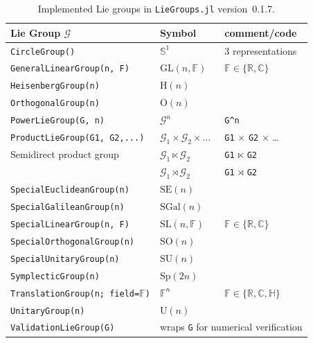 \documentclass{juliacon}
\newcommand{\LieGroupsVersion}{0.1.7}
\begin{document}
\begin{table}[tbp]
    \centering
    \caption{Implemented Lie groups in \texttt{LieGroups.jl} version~\LieGroupsVersion{}.}
    \begin{tabular}{@{}lll@{}}
        \toprule
        \textbf{Lie Group $\mathcal G$} & \textbf{Symbol} & comment/code\\
        \midrule
        \verb|CircleGroup()| & \(\mathbb{S}^1\) & 3 representations \\
        \verb|GeneralLinearGroup(n, F)| & \(\mathrm{GL}(n, \mathbb{F})\) & $\mathbb{F} \in \{\mathbb{R}, \mathbb{C}\}$\\
        \verb|HeisenbergGroup(n)| & \(\mathrm{H}(n)\)\\
        \verb|OrthogonalGroup(n)| & \(\mathrm{O}(n)\) &\\
        \midrule
        \verb|PowerLieGroup(G, n)| & \(\mathcal G^n\) & \verb|G^n|\\
        \verb|ProductLieGroup(G1, G2,...)| & \(\mathcal G_1 \times \mathcal G_2 \times \ldots\) & \verb|G1| $\times$ \verb|G2| $\times$ \ldots\\
        Semidirect product group & \(\mathcal G_1 \ltimes \mathcal G_2\) & \verb|G1| $\ltimes$ \verb|G2|\\
                                 & \(\mathcal G_1 \rtimes \mathcal G_2\) & \verb|G1| $\rtimes$ \verb|G2|\\
        \midrule
        \verb|SpecialEuclideanGroup(n)| & \(\mathrm{SE}(n)\) & \\
        \verb|SpecialGalileanGroup(n)| & \(\mathrm{SGal}(n)\) &  \\
        \verb|SpecialLinearGroup(n, F)| & \(\mathrm{SL}(n, \mathbb{F})\) & $\mathbb{F} \in \{\mathbb{R}, \mathbb{C}\}$\\
        \verb|SpecialOrthogonalGroup(n)| & \(\mathrm{SO}(n)\) &  \\
        \verb|SpecialUnitaryGroup(n)| & \(\mathrm{SU}(n)\) & \\
        \midrule
        \verb|SymplecticGroup(n)| & \(\mathrm{Sp}(2n)\) & \\
        \verb|TranslationGroup(n; field=|$\mathbb{F}$\verb|)| & \(\mathbb{F}^n\) & $\mathbb{F} \in \{\mathbb{R}, \mathbb{C}, \mathbb{H}\}$\\
        \verb|UnitaryGroup(n)| & \(\mathrm{U}(n)\) & \\
        \verb|ValidationLieGroup(G)| & \multicolumn{2}{l}{wraps \texttt{G} for numerical verification}\\
        \bottomrule
    \end{tabular}
    \label{tab:available_lie_groups}
\end{table}
\end{document}
